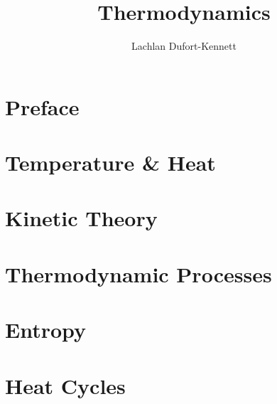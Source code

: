 \documentclass[12pt]{report}
\title{Thermodynamics}
\author{Lachlan Dufort-Kennett}
\theoremstyle{theorem}
\theoremstyle{def}
\begin{document}
    \maketitle
    \setcounter{tocdepth}{1}
    \tableofcontents

    \chapter*{Preface}

    \chapter{Temperature \& Heat}
    
    \chapter{Kinetic Theory}
    
    \chapter{Thermodynamic Processes}
    
    \chapter{Entropy}
    
    \chapter{Heat Cycles}
    

    \nocite{*}
    
    
\end{document}
